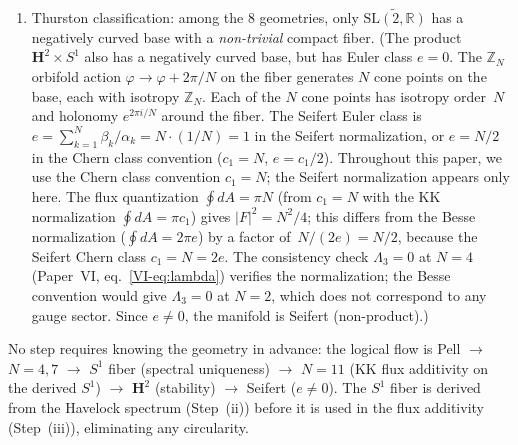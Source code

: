 \begin{proposition}
\begin{enumerate}
  $\mathbf{H}^2$.
\item[\textnormal{(v)}]
  Thurston classification: among the $8$ geometries,
  only $\widetilde{\mathrm{SL}(2,\mathbb{R})}$ has a
  negatively curved base with a \emph{non-trivial}
  compact fiber.
  (The product $\mathbf{H}^2 \times S^1$ also has a
  negatively curved base, but has Euler class $e = 0$.
  The $\mathbb{Z}_N$ orbifold action $\varphi \to
  \varphi + 2\pi/N$ on the fiber generates $N$ cone
  points on the base, each with isotropy
  $\mathbb{Z}_N$.
  Each of the $N$ cone points has isotropy order~$N$
  and holonomy $e^{2\pi i/N}$ around the fiber.
  The Seifert Euler class is
  $e = \sum_{k=1}^N \beta_k/\alpha_k = N \cdot (1/N) = 1$
  in the Seifert normalization, or $e = N/2$ in the
  Chern class convention ($c_1 = N$, $e = c_1/2$).
  Throughout this paper, we use the Chern class convention
  $c_1 = N$; the Seifert normalization appears only here.
  The flux quantization
  $\oint\!dA = \pi N$ (from $c_1 = N$ with the KK
  normalization $\oint\!dA = \pi c_1$) gives
  $|F|^2 = N^2/4$; this differs from the Besse normalization
  ($\oint\!dA = 2\pi e$) by a factor of~$N/(2e) = N/2$,
  because the Seifert Chern class $c_1 = N = 2e$.
  The consistency check
  $\Lambda_3 = 0$ at $N = 4$ (Paper~VI, eq.~\ref*{VI-eq:lambda})
  verifies the normalization; the Besse convention would give
  $\Lambda_3 = 0$ at $N = 2$, which does not correspond to
  any gauge sector.
  Since $e \ne 0$, the manifold is
  Seifert (non-product).)
\end{enumerate}
No step requires knowing the geometry in advance:
the logical flow is
Pell $\to$ $N = 4, 7$ $\to$ $S^1$ fiber (spectral uniqueness)
$\to$ $N = 11$ (KK flux additivity on the derived $S^1$)
$\to$ $\mathbf{H}^2$ (stability) $\to$ Seifert ($e \ne 0$).
The $S^1$ fiber is derived from the Havelock spectrum
(Step~(ii)) before it is used in the flux additivity
(Step~(iii)), eliminating any circularity.
\end{proposition}

